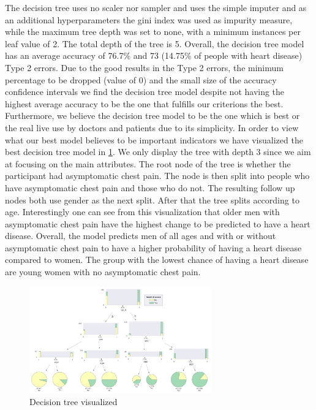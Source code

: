 The decision tree uses no scaler nor sampler and uses the simple imputer and as an additional hyperparameters the gini index was used as impurity measure, while the maximum tree depth was set to none, with a minimum instances per leaf value of 2. The total depth of the tree is 5. Overall, the decision tree model has an average accuracy of 76.7\% and 73 (14.75\% of people with heart disease) Type 2 errors. Due to the good results in the Type 2 errors, the minimum percentage to be dropped (value of 0) and the small size of the accuracy confidence intervals we find the decision tree model despite not having the highest average accuracy to be the one that fulfills our criterions the best. Furthermore, we believe the decision tree model to be the one which is best or the real live use by doctors and patients due to its simplicity.
In order to view what our best model believes to be important indicators we have visualized the best decision tree model in \cref{fig:DecisionTree}. We only display the tree with depth 3 since we aim at focusing on the main attributes. The root node of the tree is whether the participant had asymptomatic chest pain. The node is then split into people who have asymptomatic chest pain and those who do not. The resulting follow up nodes both use gender as the next split. After that the tree splits according to age. Interestingly one can see from this visualization that older men with asymptomatic chest pain have the highest change to be predicted to have a heart disease. Overall, the model predicts men of all ages and with or without asymptomatic chest pain to have a higher probability of having a heart disease compared to women. The group with the lowest chance of having a heart disease are young women with no asymptomatic chest pain.

\begin{figure}[h]
	\centering
	\includegraphics[width=0.7\textwidth]{images/DecisionTree.png}
	\caption{Decision tree visualized}
	\label{fig:DecisionTree}
\end{figure}